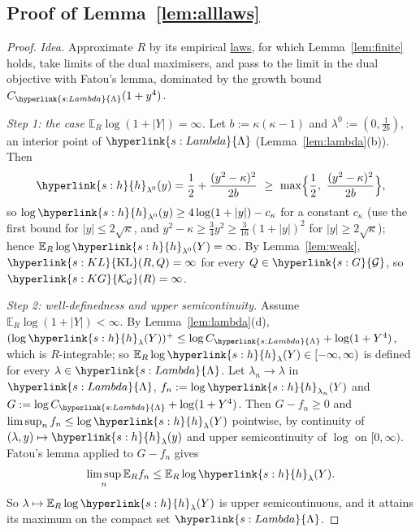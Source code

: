 \documentclass[11pt]{article}
\newcommand{\E}{\mathbb{E}}
\newcommand{\sy}[2]{{\hyperlink{#1}{#2}}}
\newcommand{\term}[2]{\hyperlink{#1}{#2}}
\newcommand{\KL}{\sy{s:KL}{\mathrm{KL}}}
\newcommand{\Gk}{\sy{s:G}{\mathcal{G}}}
\newcommand{\KG}{\sy{s:KG}{\mathcal{K}_{\mathcal{G}}}}
\newcommand{\hl}{\sy{s:h}{h}}
\newcommand{\Lam}{\sy{s:Lambda}{\Lambda}}
\begin{document}
\subsection{Proof of Lemma~\ref{lem:alllaws}}\label{sec:proof-lem-alllaws}

\begin{proof}
\emph{Idea.} Approximate $R$ by its empirical \term{w:law}{laws}, for which Lemma~\ref{lem:finite} holds, take limits of the
dual maximisers, and pass to the limit in the dual objective with Fatou's lemma, dominated by the growth
bound $C_\Lam(1+y^4)$.

\emph{Step 1: the case $\E_R\log(1+|Y|)=\infty$.} Let $b:=\kappa(\kappa-1)$ and $\lambda^0:=(0,\frac1{2b})$, an interior point of $\Lam$
(Lemma~\ref{lem:lambda}(b)). Then
\begin{equation*}
  \hl_{\lambda^0}(y)=\frac12+\frac{(y^2-\kappa)^2}{2b}\ \ge\ \max\Bigl\{\frac12,\ \frac{(y^2-\kappa)^2}{2b}\Bigr\},
\end{equation*}
so $\log\hl_{\lambda^0}(y)\ge4\log(1+|y|)-c_\kappa$ for a constant $c_\kappa$ (use the first bound for $|y|\le2\sqrt\kappa$, and
$y^2-\kappa\ge\frac34y^2\ge\frac3{16}(1+|y|)^2$ for $|y|\ge2\sqrt\kappa$); hence $\E_R\log\hl_{\lambda^0}(Y)=\infty$. By
Lemma~\ref{lem:weak}, $\KL(R,Q)=\infty$ for every $Q\in\Gk$, so $\KG(R)=\infty$.

\emph{Step 2: well-definedness and upper semicontinuity.} Assume $\E_R\log(1+|Y|)<\infty$. By
Lemma~\ref{lem:lambda}(d), $(\log\hl_\lambda(Y))^+\le\log C_\Lam+\log(1+Y^4)$, which is $R$-integrable; so
$\E_R\log\hl_\lambda(Y)\in[-\infty,\infty)$ is defined for every $\lambda\in\Lam$. Let $\lambda_n\to\lambda$ in $\Lam$, $f_n:=\log\hl_{\lambda_n}(Y)$ and
$G:=\log C_\Lam+\log(1+Y^4)$. Then $G-f_n\ge0$ and $\limsup_nf_n\le\log\hl_\lambda(Y)$ pointwise, by continuity of
$(\lambda,y)\mapsto\hl_\lambda(y)$ and upper semicontinuity of $\log$ on $[0,\infty)$. Fatou's lemma applied to $G-f_n$ gives
\begin{equation*}
  \limsup_n\E_Rf_n\le\E_R\log\hl_\lambda(Y).
\end{equation*}
So $\lambda\mapsto\E_R\log\hl_\lambda(Y)$ is upper semicontinuous, and it attains its maximum on the compact set $\Lam$.


\end{proof}
\end{document}
